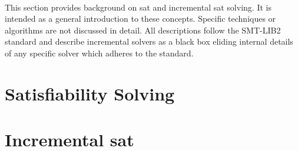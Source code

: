 ~\label{chapter:background}

This section provides background on \ac{sat} and incremental \ac{sat} solving.
It is intended as a general introduction to these concepts. Specific techniques
or algorithms are not discussed in detail. All descriptions follow the
SMT-LIB2~\cite{BarFT-SMTLIB} standard and describe incremental solvers as a
black box eliding internal details of any specific solver which adheres to the
standard.

\section{Satisfiability Solving}


\section{Incremental \acl{sat}}


